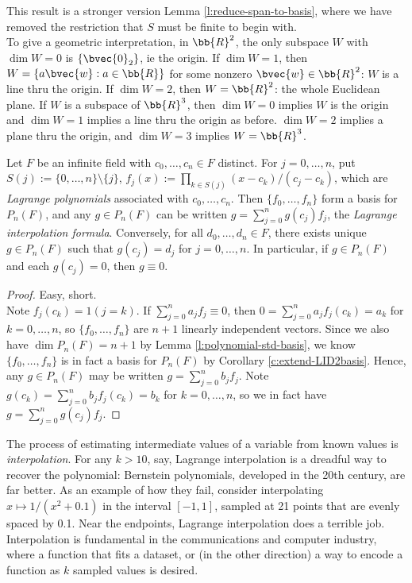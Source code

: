 This result is a stronger version Lemma \ref{l:reduce-span-to-basis}, where we have removed the restriction that $S$ must be finite to begin with.\\
To give a geometric interpretation, in $\bb{R}^2$, the only subspace $W$ with $\dim W=0$ is $\{ \bvec{0}_2\}$, ie the origin. If $\dim W=1$, then $W= \{ a \bvec{w}:a \in \bb{R}\}$ for some nonzero $\bvec{w}\in \bb{R}^2$: $W$ is a line thru the origin. If $\dim W=2$, then $W= \bb{R}^2$: the whole Euclidean plane.
If $W$ is a subspace of $\bb{R}^3$, then $\dim W=0$ implies $W$ is the origin and $\dim W=1$ implies a line thru the origin as before. $\dim W=2$ implies a plane thru the origin, and $\dim W=3$ implies $W= \bb{R}^3$.
\begin{prop}\label{p:Lagrange-poly}
Let $F$ be an infinite field with $c_0, \ldots,c_n \in F$ distinct. For $j=0, \ldots,n$, put $S(j):= \{0, \ldots,n \}\setminus \{ j\}$, $f_j(x):= \prod_{k \in S(j)}(x-c_k)/(c_j-c_k)$, which are \emph{Lagrange polynomials} associated with $c_0, \ldots,c_n$.
Then $\{ f_0, \ldots,f_n \}$ form a basis for $P_n(F)$, and any $g \in P_n(F)$ can be written $g= \sum_{j=0}^ng(c_j)f_j$, the \emph{Lagrange interpolation formula}. Conversely, for all $d_0, \ldots,d_n \in F$, there exists unique $g \in P_n(F)$ such that $g(c_j)=d_j$ for $j=0, \ldots,n$. In particular, if $g \in P_n(F)$ and each $g(c_j)=0$, then $g \equiv 0$.
\end{prop}
\begin{proof}
Easy, short.\\
Note $f_j(c_k)=1(j=k)$. If $\sum_{j=0}^na_jf_j \equiv 0$, then $0= \sum_{j=0}^na_jf_j(c_k)=a_k$ for $k=0, \ldots,n$, so $\{ f_0, \ldots,f_n \}$ are $n+1$ linearly independent vectors. Since we also have $\dim P_n(F)=n+1$ by Lemma \ref{l:polynomial-std-basis}, we know $\{ f_0, \ldots,f_n \}$ is in fact a basis for $P_n(F)$ by Corollary \ref{c:extend-LID2basis}.
Hence, any $g \in P_n(F)$ may be written $g= \sum_{j=0}^nb_jf_j$. Note $g(c_k)= \sum_{j=0}^nb_jf_j(c_k)=b_k$ for $k=0, \ldots,n$, so we in fact have $g= \sum_{j=0}^ng(c_j)f_j$.
\end{proof}
The process of estimating intermediate values of a variable from known values is \emph{interpolation}. For any $k>10$, say, Lagrange interpolation is a dreadful way to recover the polynomial: Bernstein polynomials, developed in the 20th century, are far better.
As an example of how they fail, consider interpolating $x \mapsto 1/(x^2+0.1)$ in the interval $[-1,1]$, sampled at 21 points that are evenly spaced by 0.1. Near the endpoints, Lagrange interpolation does a terrible job.
Interpolation is fundamental in the communications and computer industry, where a function that fits a dataset, or (in the other direction) a way to encode a function as $k$ sampled values is desired.

